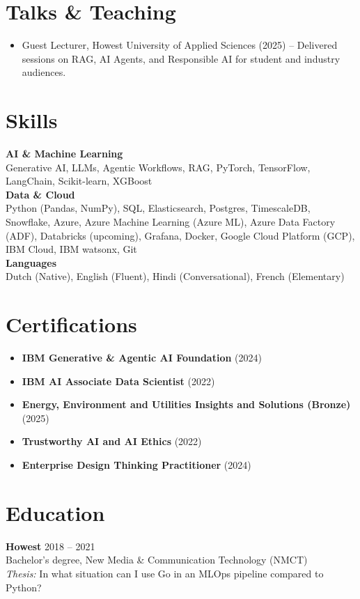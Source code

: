 \documentclass[10pt,a4paper]{article}
\begin{document}
\section*{Talks \& Teaching}
\begin{itemize}
  \item Guest Lecturer, Howest University of Applied Sciences (2025) -- Delivered sessions on RAG, AI Agents, and Responsible AI for student and industry audiences.
\end{itemize}

\section*{Skills}
\textbf{AI \& Machine Learning}\\
Generative AI, LLMs, Agentic Workflows, RAG, PyTorch, TensorFlow, LangChain, Scikit-learn, XGBoost\\[4pt]
\textbf{Data \& Cloud}\\
Python (Pandas, NumPy), SQL, Elasticsearch, Postgres, TimescaleDB, Snowflake, Azure, Azure Machine Learning (Azure ML), Azure Data Factory (ADF), Databricks (upcoming), Grafana, Docker, Google Cloud Platform (GCP), IBM Cloud, IBM watsonx, Git\\[4pt]
\textbf{Languages}\\
Dutch (Native), English (Fluent), Hindi (Conversational), French (Elementary)

\section*{Certifications}
\begin{itemize}
  \item \textbf{IBM Generative \& Agentic AI Foundation} (2024)
  \item \textbf{IBM AI Associate Data Scientist} (2022)
  \item \textbf{Energy, Environment and Utilities Insights and Solutions (Bronze)} (2025)
  \item \textbf{Trustworthy AI and AI Ethics} (2022)
  \item \textbf{Enterprise Design Thinking Practitioner} (2024)
\end{itemize}

\section*{Education}
\textbf{Howest} \hfill 2018 -- 2021\\
Bachelor's degree, New Media \& Communication Technology (NMCT)\\
\textit{Thesis:} In what situation can I use Go in an MLOps pipeline compared to Python?
\end{document}
